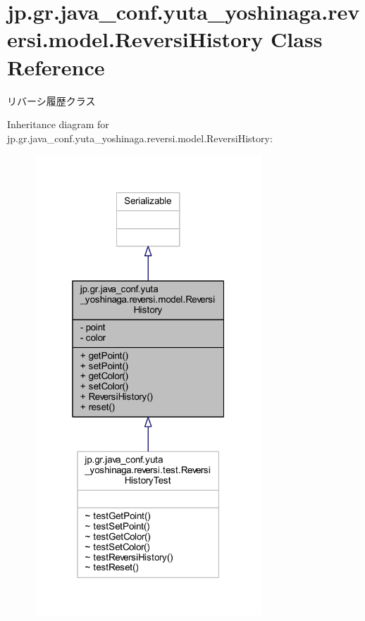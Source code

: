 \hypertarget{classjp_1_1gr_1_1java__conf_1_1yuta__yoshinaga_1_1reversi_1_1model_1_1_reversi_history}{}\section{jp.\+gr.\+java\+\_\+conf.\+yuta\+\_\+yoshinaga.\+reversi.\+model.\+Reversi\+History Class Reference}
\label{classjp_1_1gr_1_1java__conf_1_1yuta__yoshinaga_1_1reversi_1_1model_1_1_reversi_history}


リバーシ履歴クラス  




Inheritance diagram for jp.\+gr.\+java\+\_\+conf.\+yuta\+\_\+yoshinaga.\+reversi.\+model.\+Reversi\+History\+:
\nopagebreak
\begin{figure}[H]
\begin{center}
\leavevmode
\includegraphics[width=241pt]{classjp_1_1gr_1_1java__conf_1_1yuta__yoshinaga_1_1reversi_1_1model_1_1_reversi_history__inherit__graph}
\end{center}
\end{figure}


